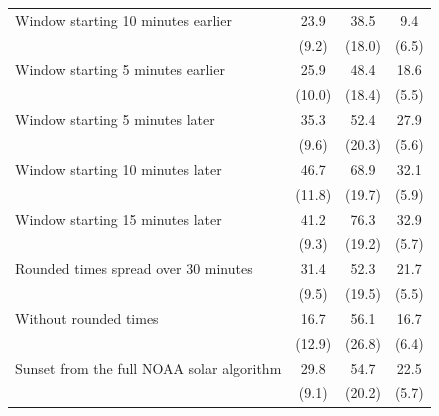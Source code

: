\begin{tabular}{@{}l ccc@{}}
Window starting 10 minutes earlier & 23.9 & 38.5 & 9.4 \\
 & (9.2) & (18.0) & (6.5) \\
Window starting 5 minutes earlier & 25.9 & 48.4 & 18.6 \\
 & (10.0) & (18.4) & (5.5) \\
Window starting 5 minutes later & 35.3 & 52.4 & 27.9 \\
 & (9.6) & (20.3) & (5.6) \\
Window starting 10 minutes later & 46.7 & 68.9 & 32.1 \\
 & (11.8) & (19.7) & (5.9) \\
Window starting 15 minutes later & 41.2 & 76.3 & 32.9 \\
 & (9.3) & (19.2) & (5.7) \\
Rounded times spread over 30 minutes & 31.4 & 52.3 & 21.7 \\
 & (9.5) & (19.5) & (5.5) \\
Without rounded times & 16.7 & 56.1 & 16.7 \\
 & (12.9) & (26.8) & (6.4) \\
Sunset from the full NOAA solar algorithm & 29.8 & 54.7 & 22.5 \\
 & (9.1) & (20.2) & (5.7) \\
\bottomrule
\end{tabular}
